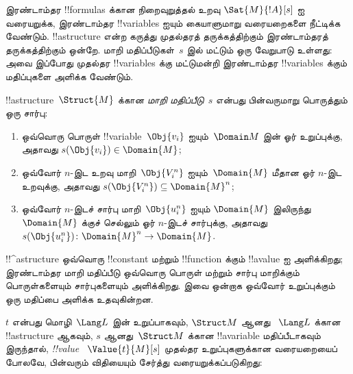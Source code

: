 \documentclass[../../../include/open-logic-section]{subfiles}
\begin{document}



\begin{explain}
இரண்டாம்தர !!{formula}s க்கான நிறைவுறுத்தல் உறவு
$\Sat{M}{!A}[s]$ ஐ வரையறுக்க, இரண்டாம்தர !!{variable}s ஐயும்
கையாளுமாறு வரையறைகளை நீட்டிக்க வேண்டும். !!a{structure} என்ற
கருத்து முதல்தரத் தருக்கத்திற்கும் இரண்டாம்தரத் தருக்கத்திற்கும்
ஒன்றே. மாறி மதிப்பீடுகள்~$s$ இல் மட்டும் ஒரு வேறுபாடு உள்ளது:
அவை இப்போது முதல்தர !!{variable}s க்கு மட்டுமன்றி இரண்டாம்தர
!!{variable}s க்கும் மதிப்புகளை அளிக்க வேண்டும்.
\end{explain}

\begin{defn}[மாறி மதிப்பீடு]
!!a{structure}~$\Struct{M}$ க்கான \emph{மாறி மதிப்பீடு}~$s$ என்பது
பின்வருமாறு பொருத்தும் ஒரு சார்பு:
\begin{enumerate}
\item ஒவ்வொரு பொருள் !!{variable}~$\Obj{v_i}$ ஐயும்~$\Domain M$ இன்
  ஓர் உறுப்புக்கு, அதாவது $s(\Obj{v_i}) \in \Domain{M}$;
\item ஒவ்வோர் $n$-இட உறவு மாறி~$\Obj{V_i^n}$ ஐயும்~$\Domain{M}$
  மீதான ஓர் $n$-இட உறவுக்கு, அதாவது
  $s(\Obj{V_i^n}) \subseteq \Domain{M}^n$;
\item ஒவ்வோர் $n$-இடச் சார்பு மாறி~$\Obj{u_i^n}$ ஐயும்
  $\Domain{M}$ இலிருந்து $\Domain{M}$ க்குச் செல்லும் ஓர் $n$-இடச்
  சார்புக்கு, அதாவது
  $s(\Obj{u_i^n})\colon \Domain{M}^n \to \Domain{M}$.
\end{enumerate}
\end{defn}

\begin{explain}
!!^a{structure} ஒவ்வொரு !!{constant} மற்றும் !!{function} க்கும்
!!a{value} ஐ அளிக்கிறது; இரண்டாம்தர மாறி மதிப்பீடு ஒவ்வொரு பொருள்
மற்றும் சார்பு மாறிக்கும் பொருள்களையும் சார்புகளையும் அளிக்கிறது.
இவை ஒன்றாக ஒவ்வோர் உறுப்புக்கும் ஒரு மதிப்பை அளிக்க உதவுகின்றன.
\end{explain}

\begin{defn}
$t$ என்பது மொழி~$\Lang L$ இன் உறுப்பாகவும், $\Struct M$ ஆனது
~$\Lang L$ க்கான !!a{structure} ஆகவும், $s$ ஆனது~$\Struct M$
க்கான !!a{variable} மதிப்பீடாகவும் இருந்தால், \emph{!!{value}}
~$\Value{t}{M}[s]$ முதல்தர உறுப்புகளுக்கான வரையறையைப் போலவே,
பின்வரும் விதியையும் சேர்த்து வரையறுக்கப்படுகிறது:
\begin{quote}
\end{quote}
\end{defn}
\end{document}
